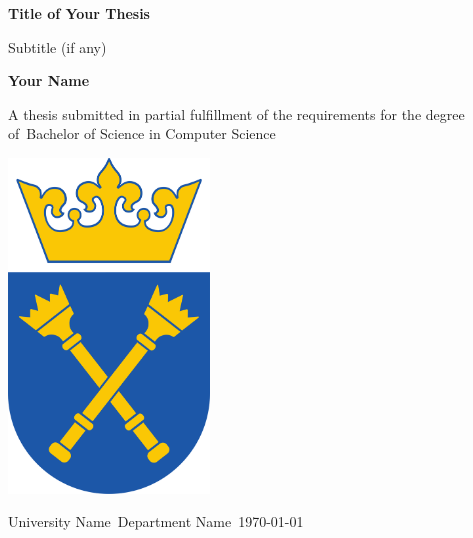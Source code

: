 \begin{titlepage}
    \begin{center}
        \vspace*{1cm}
        
        \Huge
        \textbf{Title of Your Thesis}
        
        \vspace{0.5cm}
        \LARGE
        Subtitle (if any)
        
        \vspace{1.5cm}
        
        \textbf{Your Name}
        
        \vfill
        
        A thesis submitted in partial fulfillment of the requirements for the degree of\
        Bachelor of Science in Computer Science
        
        \vspace{0.8cm}
        
        \includegraphics[width=0.4\textwidth]{university_logo.png}
        
        \Large
        University Name\
        Department Name\
        \today
        
    \end{center}
\end{titlepage}
